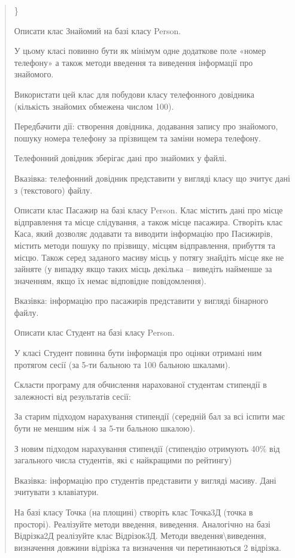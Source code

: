 \documentclass[]{article}
\begin{document}
\begin{quote}
\}

Описати клас Знайомий на базі класу Person.

У цьому класі повинно бути як мінімум одне додаткове поле «номер
телефону» а також методи введення та виведення інформації про знайомого.

Використати цей клас для побудови класу телефонного довідника (кількість
знайомих обмежена числом 100).

Передбачити дії: створення довідника, додавання запису про знайомого,
пошуку номера телефону за прізвищем та заміни номера телефону.

Телефонний довідник зберігає дані про знайомих у файлі.

Вказівка: телефонний довідник представити у вигляді класу що зчитує дані
з (текстового) файлу.

\protect\hypertarget{_Hlk65951527}{}{}

Описати клас Пасажир на базі класу Person. Клас містить дані про місце
відправлення та місце слідування, а також місце пасажира. Створіть клас
Каса, який дозволяє додавати та виводити інформацію про Пасижирів,
містить методи пошуку по прізвищу, місцям відправлення, прибуття та
місцю. Також серед заданого масиву місць у потягу знайдіть місце яке не
зайняте (у випадку якщо таких місць декілька -- виведіть найменше за
значенням, якщо їх немає відповідне повідомлення).

Вказівка: інформацію про пасажирів представити у вигляді бінарного
файлу.

Описати клас Студент на базі класу Person.

У класі Студент повинна бути інформація про оцінки отримані ним протягом
сесії (за 5-ти бальною та 100 бальною шкалами).

Скласти програму для обчислення нарахованої студентам стипендії в
залежності від результатів сесії:

За старим підходом нарахування стипендії (середній бал за всі іспити має
бути не меншим ніж 4 за 5-ти бальною шкалою).

З новим підходом нарахування стипендії (стипендію отримують 40\% від
загального числа студентів, які є найкращими по рейтингу)

Вказівка: інформацію про студентів представити у вигляді масиву. Дані
зчитувати з клавіатури.

\protect\hypertarget{_Hlk65951500}{}{}На базі класу Точка (на площині)
створіть клас Точка3Д (точка в просторі). Реалізуйте методи введення,
виведення. Аналогічно на базі Відрізка2Д реалізуйте клас Відрізок3Д.
Методи введення\textbackslash{}виведення, визначення довжини відрізка та
визначення чи перетинаються 2 відрізка.


\end{quote}
\end{document}
